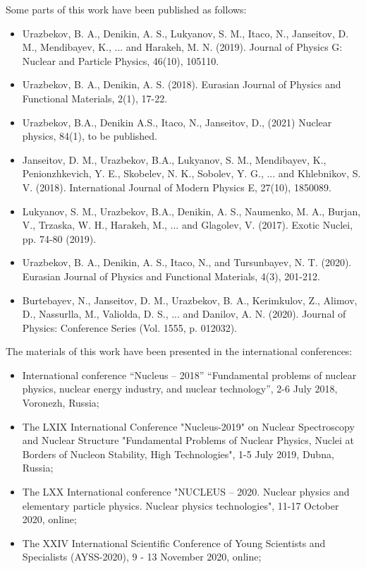\documentclass[
12pt, %
oneside, %
english, %
onehalfspacing, %
onehalfspacing, %
headsepline, %
]{MastersDoctoralThesis} %
\begin{document}
Some parts of this work have been published as follows:
\begin{itemize}
\item	Urazbekov, B. A., Denikin, A. S., Lukyanov, S. M., Itaco, N., Janseitov, D. M., Mendibayev, K., ... and Harakeh, M. N. (2019). Journal of Physics G: Nuclear and Particle Physics, 46(10), 105110.
\item	Urazbekov, B. A.,  Denikin, A. S. (2018).  Eurasian Journal of Physics and Functional Materials, 2(1), 17-22.
\item	Urazbekov, B.A., Denikin A.S., Itaco, N., Janseitov, D., (2021)  Nuclear physics, 84(1), to be published.
\item	Janseitov, D. M., Urazbekov, B.A., Lukyanov, S. M., Mendibayev, K., Penionzhkevich, Y. E., Skobelev, N. K., Sobolev, Y. G., ... and Khlebnikov, S. V. (2018).  International Journal of Modern Physics E, 27(10), 1850089.
\item	Lukyanov, S. M., Urazbekov, B.A., Denikin, A. S., Naumenko, M. A., Burjan, V., Trzaska, W. H., Harakeh, M., ... and Glagolev, V. (2017). 
 Exotic Nuclei, pp. 74-80 (2019).
\item	Urazbekov, B. A., Denikin, A. S., Itaco, N., and Tursunbayev, N. T. (2020).  Eurasian Journal of Physics and Functional Materials, 4(3), 201-212.
\item	Burtebayev, N., Janseitov, D. M., Urazbekov, B. A., Kerimkulov, Z., Alimov, D., Nassurlla, M., Valiolda, D. S., ... and Danilov, A. N. (2020).  Journal of Physics: Conference Series (Vol. 1555, p. 012032).
\end{itemize}

The materials of this work have been presented in the international conferences:
\begin{itemize}
\item	International conference “Nucleus – 2018” “Fundamental problems of nuclear physics, nuclear energy industry, and nuclear technology”, 2-6 July 2018, Voronezh, Russia;
\item	The LXIX International Conference "Nucleus-2019" on Nuclear Spectroscopy and Nuclear Structure "Fundamental Problems of Nuclear Physics, Nuclei at Borders of Nucleon Stability, High Technologies", 1-5 July 2019, Dubna, Russia;
\item	The LXX International conference "NUCLEUS – 2020. Nuclear physics and elementary particle physics. Nuclear physics technologies", 11-17 October 2020, online;
\item	The XXIV International Scientific Conference of Young Scientists and Specialists (AYSS-2020),  9 - 13 November 2020, online;
\end{itemize} 
\end{document}
